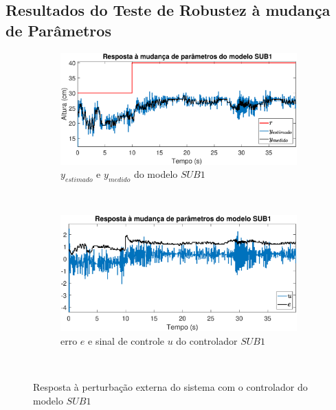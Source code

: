 \subsection{Resultados do Teste de Robustez à mudança de Parâmetros}\label{rmp}

\begin{figure}[H]
	\centering
	\begin{subfigure}[b]{1\textwidth}
		\includegraphics[width=1\linewidth]{mprsub1y}
		\caption[$y_{estimado}$ e $y_{medido}$ do modelo $SUB1$]{$y_{estimado}$ e $y_{medido}$ do modelo $SUB1$}
		\label{fig:mprsub1y}
	\end{subfigure}
	~ %
	\begin{subfigure}[b]{1\textwidth}
		\includegraphics[width=1\linewidth]{mprsub1e}
		\caption[erro $e$ e sinal de controle $u$ do controlador $SUB1$]{erro $e$ e sinal de controle $u$ do controlador $SUB1$}
		\label{fig:mprsub1e}
	\end{subfigure}
	~ %
	
	\caption{Resposta à perturbação externa do sistema com o controlador do modelo $SUB1$}\label{fig:mprsub1}
\end{figure}

